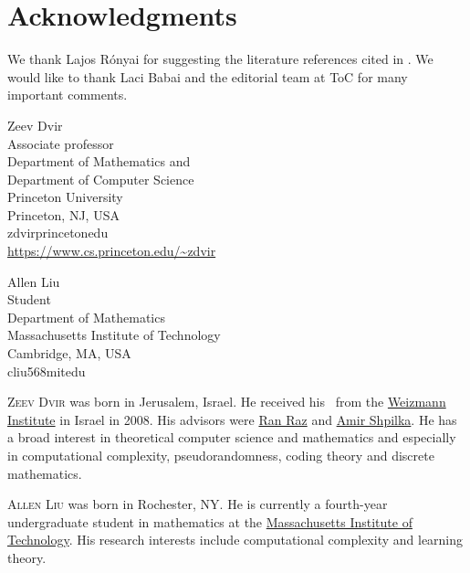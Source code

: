 \documentclass{toc}
\begin{document}
\section*{Acknowledgments}
We thank Lajos R\'onyai for suggesting 
the literature references
cited in .
We would like to thank Laci Babai and the
editorial team at ToC for many important comments.
\nocite{conf-version}


%
%
%
%
%


%
%
%
%
%
\begin{tocauthors}
\begin{tocinfo}[dvir]
 Zeev Dvir\\
 Associate professor\\
 Department of Mathematics and\\
 Department of Computer Science\\
 Princeton University\\
 Princeton, NJ, USA\\
 zdvir\tocat{}princeton\tocdot{}edu \\   %
 \url{https://www.cs.princeton.edu/~zdvir}      %
\end{tocinfo}
\begin{tocinfo}[liu]
  Allen Liu\\
  Student\\
  Department of Mathematics \\
  Massachusetts Institute of Technology\\
  Cambridge, MA, USA\\
  cliu568\tocat{}mit\tocdot{}edu \\
  \url{}
\end{tocinfo}
\end{tocauthors}

%
%
%
%
%
%
%
%
%
%
%
%
%
%
\begin{tocaboutauthors}
\begin{tocabout}[dvir]  %
  \textsc{Zeev Dvir} was born in Jerusalem, Israel.  He received his \phd\ 
from the
  \href{https://www.weizmann.ac.il/pages/}{Weizmann Institute} in Israel 
in 2008.  His advisors were 
  \href{http://www.wisdom.weizmann.ac.il/~ranraz/}{Ran Raz} and \href{http://www.cs.technion.ac.il/~shpilka/}{Amir Shpilka}. He has a broad interest in theoretical computer science and mathematics and especially in computational complexity, pseudorandomness, coding theory and discrete mathematics.
\end{tocabout}
\begin{tocabout}[liu]
\textsc{Allen Liu} was born in Rochester, NY.  He is currently a fourth-year undergraduate student in mathematics at the \href{http://www.mit.edu/}{Massachusetts Institute of Technology}. His research interests include computational complexity and learning theory.  
\end{tocabout}
\end{tocaboutauthors}
\end{document}
